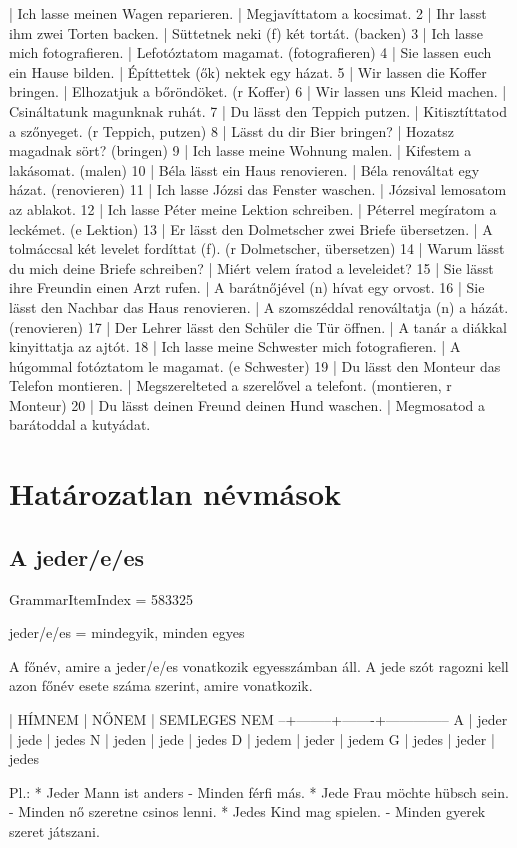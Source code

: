 \documentclass{article}
\newenvironment{desc}{\verbatim}{\endverbatim}
\newenvironment{exmp}{\verbatim}{\endverbatim}
\begin{document}
\begin{exmp}
1 | Ich lasse meinen Wagen reparieren. | Megjavíttatom a kocsimat.
2 | Ihr lasst ihm zwei Torten backen. | Süttetnek neki (f) két tortát. (backen)
3 | Ich lasse mich fotografieren. | Lefotóztatom magamat. (fotografieren)
4 | Sie lassen euch ein Hause bilden. | Építtettek (ők) nektek egy házat.
5 | Wir lassen die Koffer bringen. | Elhozatjuk a bőröndöket. (r Koffer)
6 | Wir lassen uns Kleid machen. | Csináltatunk magunknak ruhát.
7 | Du lässt den Teppich putzen. | Kitisztíttatod a szőnyeget. (r Teppich, putzen)
8 | Lässt du dir Bier bringen? | Hozatsz magadnak sört? (bringen)
9 | Ich lasse meine Wohnung malen. | Kifestem a lakásomat. (malen)
10 | Béla lässt ein Haus renovieren. | Béla renováltat egy házat. (renovieren)
11 | Ich lasse Józsi das Fenster waschen. | Józsival lemosatom az ablakot.
12 | Ich lasse Péter meine Lektion schreiben. | Péterrel megíratom a leckémet. (e Lektion)
13 | Er lässt den Dolmetscher zwei Briefe übersetzen. | A tolmáccsal két levelet fordíttat (f). (r Dolmetscher, übersetzen)
14 | Warum lässt du mich deine Briefe schreiben? | Miért velem íratod a leveleidet?
15 | Sie lässt ihre Freundin einen Arzt rufen. | A barátnőjével (n) hívat egy orvost.
16 | Sie lässt den Nachbar das Haus renovieren. | A szomszéddal renováltatja (n) a házát. (renovieren)
17 | Der Lehrer lässt den Schüler die Tür öffnen. | A tanár a diákkal kinyittatja az ajtót.
18 | Ich lasse meine Schwester mich fotografieren. | A húgommal fotóztatom le magamat. (e Schwester)
19 | Du lässt den Monteur das Telefon montieren. | Megszerelteted a szerelővel a telefont. (montieren, r Monteur)
20 | Du lässt deinen Freund deinen Hund waschen. | Megmosatod a barátoddal a kutyádat.
\end{exmp}

\section{Határozatlan névmások}

\subsection{A jeder/e/es}

GrammarItemIndex = 583325

\begin{desc}
jeder/e/es = mindegyik, minden egyes

A főnév, amire a jeder/e/es vonatkozik egyesszámban áll. A jede szót ragozni kell azon főnév esete száma szerint, amire vonatkozik.

  | HÍMNEM | NŐNEM | SEMLEGES NEM
--+--------+-------+--------------
A | jeder  | jede  | jedes
N | jeden  | jede  | jedes
D | jedem  | jeder | jedem
G | jedes  | jeder | jedes

Pl.: * Jeder Mann ist anders - Minden férfi más.
* Jede Frau möchte hübsch sein. - Minden nő szeretne csinos lenni.
* Jedes Kind mag spielen. - Minden gyerek szeret játszani.
\end{desc}
\end{document}
